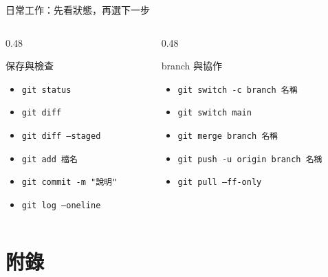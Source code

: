 \documentclass[xetex, unicode, 10pt, aspectratio=169]{beamer}
\begin{document}
\begin{frame}{日常工作：先看狀態，再選下一步}
    \begin{columns}[t]
        \begin{column}{0.48\textwidth}
            \begin{block}{保存與檢查}
                \begin{itemize}
                    \item \texttt{git status}
                    \item \texttt{git diff}
                    \item \texttt{git diff --staged}
                    \item \texttt{git add 檔名}
                    \item \texttt{git commit -m "說明"}
                    \item \texttt{git log --oneline}
                \end{itemize}
            \end{block}
        \end{column}
        \begin{column}{0.48\textwidth}
            \begin{block}{branch 與協作}
                \begin{itemize}
                    \item \texttt{git switch -c branch 名稱}
                    \item \texttt{git switch main}
                    \item \texttt{git merge branch 名稱}
                    \item \texttt{git push -u origin branch 名稱}
                    \item \texttt{git pull --ff-only}
                \end{itemize}
            \end{block}
        \end{column}
    \end{columns}
\end{frame}

\appendix
\section{附錄}
\end{document}
